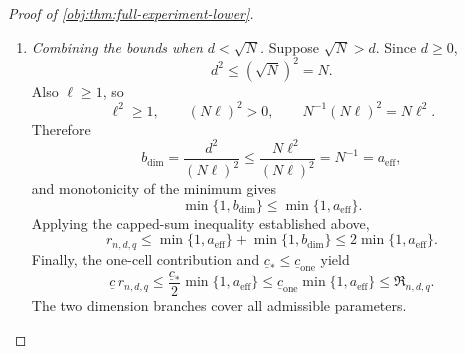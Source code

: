 \begin{proof}[Proof of \cref{obj:thm:full-experiment-lower}]
\begin{enumerate}
For the nonnegative quantities \(a_{\mathrm{eff}},b_{\mathrm{dim}}\),
\[
\min\{1,a_{\mathrm{eff}}+b_{\mathrm{dim}}\}
\le
\min\{1,a_{\mathrm{eff}}\}+\min\{1,b_{\mathrm{dim}}\}.
\]
Indeed, if both quantities are at most one, the right-hand side is their sum;
if either is at least one, the right-hand side is at least one.
Each capped quantity is at most their maximum, so
\[
\min\{1,a_{\mathrm{eff}}+b_{\mathrm{dim}}\}
\le
2\max\{\min\{1,a_{\mathrm{eff}}\},\min\{1,b_{\mathrm{dim}}\}\},
\]
while the component risk bounds imply
\[
\underline c_*
\max\{\min\{1,a_{\mathrm{eff}}\},\min\{1,b_{\mathrm{dim}}\}\}
\le\mathfrak R_{n,d,q}.
\]
Since \(\mathfrak R_{n,d,q}\ge0\), we conclude that
\[
\underline c\,r_{n,d,q}
\le
\frac{\underline c_*}{2}
\max\{\min\{1,a_{\mathrm{eff}}\},\min\{1,b_{\mathrm{dim}}\}\}
\le\frac12\mathfrak R_{n,d,q}
\le\mathfrak R_{n,d,q}.
\]

\item \emph{Combining the bounds when \(d<\sqrt N\).}
Suppose \(\sqrt N>d\). Since \(d\ge0\),
\[
d^2\le(\sqrt N)^2=N.
\]
Also \(\ell\ge1\), so
\[
\ell^2\ge1,\qquad
(N\ell)^2>0,\qquad
N^{-1}(N\ell)^2=N\ell^2.
\]
Therefore
\[
b_{\mathrm{dim}}
=\frac{d^2}{(N\ell)^2}
\le\frac{N\ell^2}{(N\ell)^2}
=N^{-1}
=a_{\mathrm{eff}},
\]
and monotonicity of the minimum gives
\[
\min\{1,b_{\mathrm{dim}}\}
\le\min\{1,a_{\mathrm{eff}}\}.
\]
Applying the capped-sum inequality established above,
\[
r_{n,d,q}
\le
\min\{1,a_{\mathrm{eff}}\}+\min\{1,b_{\mathrm{dim}}\}
\le2\min\{1,a_{\mathrm{eff}}\}.
\]
Finally, the one-cell contribution and
\(\underline c_*\le\underline c_{\mathrm{one}}\) yield
\[
\underline c\,r_{n,d,q}
\le
\frac{\underline c_*}{2}\min\{1,a_{\mathrm{eff}}\}
\le
\underline c_{\mathrm{one}}\min\{1,a_{\mathrm{eff}}\}
\le\mathfrak R_{n,d,q}.
\]
The two dimension branches cover all admissible parameters.
\end{enumerate}
\end{proof}
